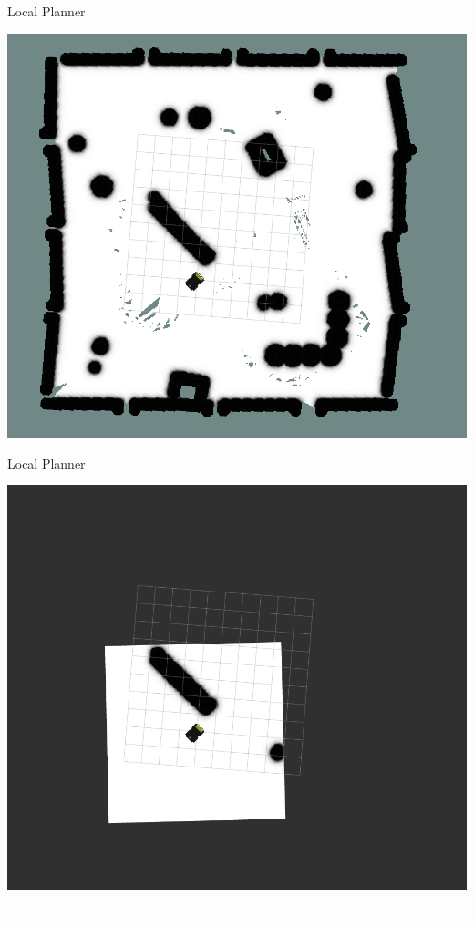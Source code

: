 \documentclass{beamer}
\begin{document}
\begin{frame}{Local Planner}
	\subtitle{Navigation Stack} 
	\centering
	\includegraphics[width=.7\linewidth]{figures/costmap_1.png}
\end{frame}
\begin{frame}{Local Planner}
	\subtitle{Navigation Stack} 
	\centering
	\includegraphics[width=.7\linewidth]{figures/costmap_2.png}
\end{frame}

\begin{frame}[plain]{}  
	\centering
	{\huge \textcolor{white}{Demo} }
\end{frame}


\end{document}
